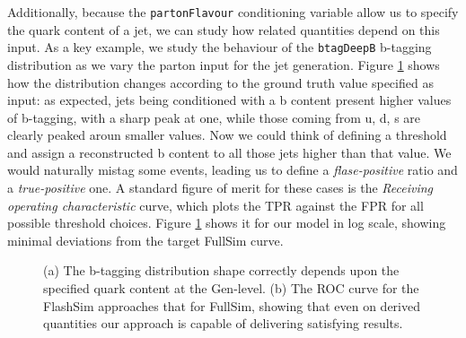 Additionally, because the \texttt{partonFlavour} conditioning variable allow us to specify the quark content of a jet, we can study how related quantities depend on this input. As a key example, we study the behaviour of the \texttt{btagDeepB} b-tagging distribution as we vary the parton input for the jet generation. Figure \ref{fig:roc1} shows how the distribution changes according to the ground truth value specified as input: as expected, jets being conditioned with a b content present higher values of b-tagging, with a sharp peak at one, while those coming from u, d, s are clearly peaked aroun smaller values. Now we could think of defining a threshold and assign a reconstructed b content to all those jets higher than that value. We would naturally mistag some events, leading us to define a \emph{flase-positive} ratio and a \emph{true-positive} one. A standard figure of merit for these cases is the \emph{Receiving operating characteristic} curve, which plots the TPR against the FPR for all possible threshold choices. Figure \ref{fig:roc1} shows it for our model in log scale, showing minimal deviations from the target FullSim curve.


\begin{figure}
    \myfloatalign
    \caption[b-tagging and ROC]{ (a) The b-tagging distribution shape correctly depends upon the specified quark content at the Gen-level. (b) The ROC curve for the FlashSim approaches that for FullSim, showing that even on derived quantities our approach is capable of delivering satisfying results.}\label{fig:roc1}
    
\end{figure}

